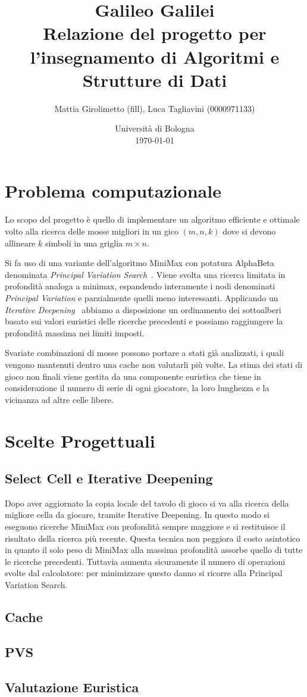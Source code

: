 \documentclass{article}
\title{Galileo Galilei \\
\large Relazione del progetto per l'insegnamento di Algoritmi e Strutture di Dati}
\author{
  Mattia Girolimetto (fill),
  Luca Tagliavini (0000971133)
}
\date{
	Universit\`a di Bologna \\
  \today
}
\begin{document}
\maketitle

\section{Problema computazionale}

Lo scopo del progetto \`e quello di implementare un algoritmo efficiente e ottimale
volto alla ricerca delle mosse migliori in un gico $(m,n,k)$ dove si devono
allineare $k$ simboli in una griglia $m \times n$.

Si fa uso di una variante dell'algoritmo MiniMax con potatura
AlphaBeta denominata \emph{Principal Variation Search}~\cite{negascout}. Viene
svolta una ricerca limitata in profondit\`a analoga a minimax, espandendo
interamente i nodi denominati \emph{Principal Variation} e parzialmente quelli
meno interessanti. Applicando un \emph{Iterative Deepening}~\cite{id} abbiamo
a disposizione un ordinamento dei sottoalberi basato sui valori euristici delle
ricerche precedenti e possiamo raggiungere la profondit\`a massima nei limiti
imposti.

Svariate combinazioni di mosse possono portare a stati gi\`a analizzati, i quali
vengono mantenuti dentro una cache non valutarli pi\`u volte.
La stima dei stati di gioco non finali viene gestita da una componente euristica che
tiene in considerazione il numero di serie di ogni giocatore, la loro lunghezza
e la vicinanza ad altre celle libere.

\section{Scelte Progettuali}

\subsection{Select Cell e Iterative Deepening}

Dopo aver aggiornato la copia locale del tavolo di gioco si va alla ricerca
della migliore cella da giocare, tramite Iterative Deepening.
In questo modo si eseguono ricerche MiniMax con profondit\`a sempre maggiore
e si restituisce il risultato della ricerca pi\`u recente. Questa tecnica non
peggiora il costo asintotico in quanto il solo peso di MiniMax alla
massima profondit\`a assorbe quello di tutte le ricerche precedenti.
Tuttavia aumenta sicuramente il numero di operazioni svolte dal calcolatore:
per minimizzare questo danno si ricorre alla Principal Variation Search.

\subsection{Cache}
\subsection{PVS}
\subsection{Valutazione Euristica}

\pagebreak


\end{document}
